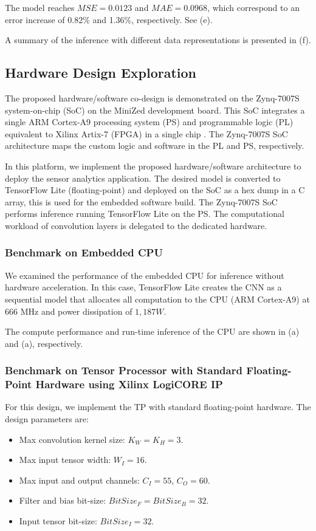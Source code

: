 The model reaches $MSE=0.0123$ and $MAE=0.0968$, which correspond to an error increase of 0.82\% and 1.36\%, respectively. See (e).

A summary of the inference with different data representations is presented in (f).

\subsection{Hardware Design Exploration}
The proposed hardware/software co-design is demonstrated on the Zynq-7007S system-on-chip (SoC) on the MiniZed development board. This SoC integrates a single ARM Cortex-A9 processing system (PS) and programmable logic (PL) equivalent to Xilinx Artix-7 (FPGA) in a single chip \cite{xilinx2015zynq}. The Zynq-7007S SoC architecture maps the custom logic and software in the PL and PS, respectively.

In this platform, we implement the proposed hardware/software architecture to deploy the sensor analytics application. The desired model is converted to TensorFlow Lite (floating-point) and deployed on the SoC as a hex dump in a C array, this is used for the embedded software build. The Zynq-7007S SoC performs inference running TensorFlow Lite on the PS. The computational workload of convolution layers is delegated to the dedicated hardware.

\subsubsection{Benchmark on Embedded CPU}
We examined the performance of the embedded CPU for inference without hardware acceleration. In this case, TensorFlow Lite creates the CNN as a sequential model that allocates all computation to the CPU (ARM Cortex-A9) at 666 MHz and power dissipation of $1,187 W$.

The compute performance and run-time inference of the CPU are shown in (a) and (a), respectively.

\subsubsection{Benchmark on Tensor Processor with Standard Floating-Point Hardware using Xilinx LogiCORE IP}
For this design, we implement the TP with standard floating-point hardware. The design parameters are:
\begin{itemize}
	\item Max convolution kernel size: $K_W = K_H = 3$.
	\item Max input tensor width: $W_I = 16$.
	\item Max input and output channels: $C_I = 55$, $C_O = 60$.
	\item Filter and bias bit-size: $BitSize_F=BitSize_B=32$.
	\item Input tensor bit-size: $BitSize_I=32$.
\end{itemize}

